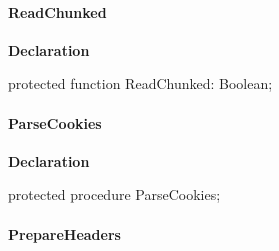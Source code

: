 \documentclass{report}
\newif\ifpdf
\begin{document}
\paragraph*{ReadChunked}\hspace*{\fill}

\label{httpsend.THTTPSend-ReadChunked}
\begin{list}{}{
\setlength{\itemindent}{0cm}
\setlength{\listparindent}{0cm}
\setlength{\leftmargin}{\evensidemargin}
\addtolength{\leftmargin}{\tmplength}
\settowidth{\labelsep}{X}
\addtolength{\leftmargin}{\labelsep}
\setlength{\labelwidth}{\tmplength}
}
\item[\textbf{Declaration}\hfill]
\ifpdf
\begin{flushleft}
\fi
\begin{ttfamily}
protected function ReadChunked: Boolean;\end{ttfamily}

\ifpdf
\end{flushleft}
\fi

\end{list}
\paragraph*{ParseCookies}\hspace*{\fill}

\label{httpsend.THTTPSend-ParseCookies}
\begin{list}{}{
\setlength{\itemindent}{0cm}
\setlength{\listparindent}{0cm}
\setlength{\leftmargin}{\evensidemargin}
\addtolength{\leftmargin}{\tmplength}
\settowidth{\labelsep}{X}
\addtolength{\leftmargin}{\labelsep}
\setlength{\labelwidth}{\tmplength}
}
\item[\textbf{Declaration}\hfill]
\ifpdf
\begin{flushleft}
\fi
\begin{ttfamily}
protected procedure ParseCookies;\end{ttfamily}

\ifpdf
\end{flushleft}
\fi

\end{list}
\paragraph*{PrepareHeaders}\hspace*{\fill}
\end{document}
